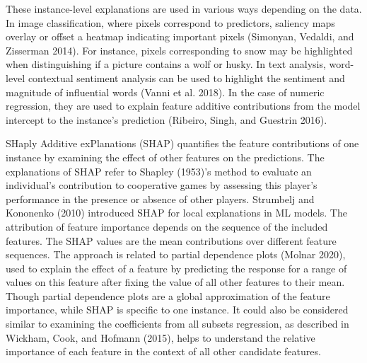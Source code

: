 \documentclass[
]{article}
\begin{document}
These instance-level explanations are used in various ways depending on the data. In image classification, where pixels correspond to predictors, saliency maps overlay or offset a heatmap indicating important pixels (Simonyan, Vedaldi, and Zisserman 2014). For instance, pixels corresponding to snow may be highlighted when distinguishing if a picture contains a wolf or husky. In text analysis, word-level contextual sentiment analysis can be used to highlight the sentiment and magnitude of influential words (Vanni et al. 2018). In the case of numeric regression, they are used to explain feature additive contributions from the model intercept to the instance's prediction (Ribeiro, Singh, and Guestrin 2016).

SHaply Additive exPlanations (SHAP) quantifies the feature contributions of one instance by examining the effect of other features on the predictions. The explanations of SHAP refer to Shapley (1953)'s method to evaluate an individual's contribution to cooperative games by assessing this player's performance in the presence or absence of other players. Strumbelj and Kononenko (2010) introduced SHAP for local explanations in ML models. The attribution of feature importance depends on the sequence of the included features. The SHAP values are the mean contributions over different feature sequences. The approach is related to partial dependence plots (Molnar 2020), used to explain the effect of a feature by predicting the response for a range of values on this feature after fixing the value of all other features to their mean. Though partial dependence plots are a global approximation of the feature importance, while SHAP is specific to one instance. It could also be considered similar to examining the coefficients from all subsets regression, as described in Wickham, Cook, and Hofmann (2015), helps to understand the relative importance of each feature in the context of all other candidate features.
\end{document}
